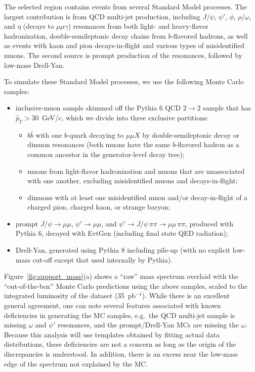 The selected region contains events from several Standard Model
processes. The largest contribution is from QCD multi-jet production,
including $J/\psi$, $\psi'$, $\phi$, $\rho/\omega$, and $\eta$ (decays
to $\mu \mu \gamma$) resonances from both light- and heavy-flavor
hadronization, double-semileptonic decay chains from $b$-flavored
hadrons, as well as events with kaon and pion decays-in-flight and
various types of misidentified muons. The second source is prompt
production of the resonances, followed by low-mass Drell-Yan.

To simulate these Standard Model processes, we use the following Monte Carlo samples:
\begin{itemize}
\item inclusive-muon sample skimmed off the Pythia 6 QCD $2\to2$ sample that has $\hat{p}_T > 30$~GeV/$c$, which we divide into three exclusive partitions:
\begin{itemize}
\item $b\bar{b}$ with one $b$-quark decaying to $\mu\mu X$ by double-semileptonic decay or dimuon resonances (both muons have the same $b$-flavored hadron as a common ancestor in the generator-level decay tree);
\item muons from light-flavor hadronization and muons that are unassociated with one another, excluding misidentified muons and decays-in-flight;
\item dimuons with at least one misidentified muon and/or decay-in-flight of a charged pion, charged kaon, or strange baryon;
\end{itemize}
\item prompt $J/\psi \to \mu\mu$, $\psi' \to \mu\mu$, and $\psi' \to J/\psi \, \pi\pi \to \mu\mu \, \pi\pi$, produced with Pythia 6,  decayed with EvtGen (including final state QED radiation);
\item Drell-Yan, generated using Pythia 8 including pile-up (with no explicit low-mass cut-off except that used internally by Pythia).
\end{itemize}

Figure~\ref{fig:support_mass}(a) shows a ``raw'' mass spectrum
overlaid with the ``out-of-the-box'' Monte Carlo predictions using the above
samples, scaled to the integrated luminosity of the dataset
(35~pb$^{-1}$). While there is an excellent general agreement, one can
note several features associated with known deficiencies in
generating the MC samples, e.g.\ the QCD multi-jet sample is missing
$\omega$ and $\psi'$ resonances, and the prompt/Drell-Yan MCs are missing
the $\omega$. Because this analysis will use templates obtained by
fitting actual data distributions, these deficiencies are not a
concern as long as the origin of the discrepancies is 
understood. In addition, there is an excess near the low-mass edge of
the spectrum not explained by the MC.

